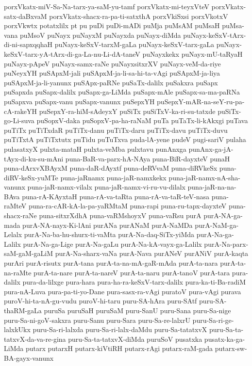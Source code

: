 {porxVkatx-miV-Sa-Na-tarx-ya-saM-yu-tamf
porxVkatx-mi-teyxVteV
porxVkatx-satx-daBxvaM
porxVkatx-shacx-ra-pa-ti-satxthA
porxVkiSxsi
porxVkotxV
porxVkwtx
potatxlilx
pt
pu
puDi
puDi-mADi
puMja
puMsAM
puMsaH
puMsa-vana
puMsoV
puNayx
puNayxM
puNayxda
puNayx-diMda
puNayx-keSxV-tArx-di-ni-sapxqqhaH
puNayx-keSxV-tarxM-gaLa
puNayx-keSxV-tarx-gaLa
puNayx-keSxV-tarx-yA-tArx-di-ga-La-nu-Li-dA-taneV
puNayxkekx
puNayx-mU-taRyaH
puNayx-pApeV
puNayx-samx-raNe
puNayxsitxrXV
puNayx-veM-da-riye
puNeyxYH
puSApxM-jali
puSApxM-ja-li-sa-hi-ta-vAgi
puSApxM-ja-liya
puSApxM-ja-li-yanunx
puSApx-paRNe
puSaTx-dalilx
puSakxra
puSapx
puSapxda
puSapx-dalilx
puSapx-ga-LiMda
puSapx-mAle
puSapx-sa-ma-paRNa
puSapxva
puSapx-vanu
puSapx-vanunx
puSepxYH
puSepxY-mAR-na-seY-ru-pa-cA-rakeYH
puSepxY-ra-hiM-sAdeyxY
puSiTx
puSiTxV-ka-ri-su-tatxde
puSiTx-go-Li-suva
puSopxV-daka
puSopxV-pa-ha-raNaM
puTa
puTaTx-li-kAkxgi
puTava
puTiTx
puTiTxdaR
puTiTx-danu
puTiTx-daru
puTiTx-davu
puTiTx-duvu
puTiTxtA
puTiTxtutx
puTidu
puTuTxva
puda-lA-yene
pudeV
pugi-sariV
pulaha
pulasatxyX
pulxta-mataH
pulxta-veMba
pulxtavu
punAnxga
punAnx-ga-jA-tAyx-di-ku-su-mAni
puna-BaR-va-parx-hA-NAya
puna-BiR-dayxteV
punaH
puna-dArxvXBAyxM
puna-daR-dAyxtf
puna-deRVvaM
puna-diRVkeSx
puna-diRV-keSx-yuMTe
puna-jaRnamx
puna-jaR-namxkekx
puna-jaR-namx-nA-sha-vanunx
puna-jaR-namx-vilalx
puna-jaR-namx-vi-ru-vu-dilalx
puna-jaR-na-na-BAva
puna-rA-KAyxtaH
puna-rA-va-taRta
puna-rA-va-taR-teV-nasa
puna-raMteV
puna-ra-cAR-kA-la-pa-yaRMtaM
puna-rapi
puna-ru-tapx-dayxteV
puna-shacx-raNe
puna-sitxrXdhA
puna-vaRMshoyxV
puna-vaRsu
purA
purA-NA-ga-mada
purA-NA-nayx-Ki-lAni
purANa
purANaM
purA-NaMDa
purA-NaM-ga-Lelalx
purA-Na-ba-hu-shurx-ti-vaMta
purA-Na-daq-SiTx-yiMda
purA-Na-ga-Lalilx
purA-Na-ga-Lige
purA-Na-gaLu
purA-Na-kA-vayx-ga-Lalilx
purA-Na-parx-saM-gaM-gaLiM
purA-Na-sharx-vaNa
purA-Nava
purANeV
purANiV
purA-kaqta
purAri
purA-risutx
purA-tana
purA-ta-na-mA-gaR-mAda
purA-ta-nara
purA-ta-na-raMte
purA-ta-nare
purA-ta-nareV
purA-ta-naru
purA-tanoV
purA-tara
pura-dalilx
pura-da-lilxge
pura-hara
pura-ha-ra-keSxV-tarx-dalilx
pura-ka-ti-Ba-radiM
pura-nA-Luva
pura-pa-ti-yo-Dane
pura-sasx-ra-vAgi
puratoV
pura-vAgi
purava
puroV-hi-ta-nA-gu-vudu
puroV-hi-taru
puru-SA-hAra
puru-SAtf
puru-SA-thaRM-gaLa
puruSa
puruSaH
puruSaM
puru-SanU
puru-Sana
puru-Sa-nige
puru-Sa-ni-goV-sakxra
puru-Sanu
puru-Sara
puru-Sa-re-lalxrU
puru-Sa-ri-ge-lalxkUkx
puru-Sa-ri-lalxda
puru-Sa-ri-lalx-daMdu
puru-Sa-tatatxvX
puru-Sa-ta-tatxvX-da-va-re-gina
puru-Sa-ta-tatxvX-diMda
puruSoV
pusatxka
pusatx-ka-ga-LiMda
putarx
putarxH
putarx-kiVtiRH
putarx-rAgi
putarx-raM-gada
putarx-sw-BA-gayx-vanunx
}
